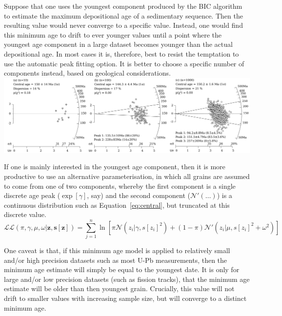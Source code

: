 \begin{refsection}
Suppose that one uses the youngest component produced by the BIC
algorithm to estimate the maximum depositional age of a sedimentary
sequence. Then the resulting value would never converge to a specific
value.  Instead, one would find this minimum age to drift to ever
younger values until a point where the youngest age component in a
large dataset becomes younger than the actual depositional age. In
most cases it is, therefore, best to resist the temptation to use the
automatic peak fitting option. It is better to choose a specific
number of components instead, based on geological considerations.\\

\noindent\includegraphics[width=\textwidth]{../figures/increasingn.png}
\begingroup {}
\label{fig:increasingn}
\endgroup

If one is mainly interested in the youngest age component, then it is
more productive to use an alternative parameterisation, in which all
grains are assumed to come from one of two components, whereby the
first component is a single discrete age peak ($\exp[\gamma]$, say)
and the second component ($\mathcal{N}'(\ldots)$) is a continuous
distribution such as Equation~\ref{eq:central}, but truncated at this
discrete value.
\begin{equation}
  \mathcal{LL}(\pi,\gamma,\mu,\omega|\mathbf{z},\mathbf{s[z]}) =
  \sum\limits_{j=1}^{n} \ln\!\left[
    \pi \mathcal{N}(z_i|\gamma,s[z_i]^2) +
    (1-\pi) \mathcal{N}'(z_i|\mu,s[z_i]^2+\omega^2)
    \right]
\label{eq:Lminagemod}
\end{equation}

One caveat is that, if this minimum age model is applied to relatively
small and/or high precision datasets such as most U-Pb measurements,
then the minimum age estimate will simply be equal to the youngest
date.  It is only for large and/or low precision datasets (such as
fission tracks), that the minimum age estimate will be older than then
youngest grain.  Crucially, this value will not drift to smaller
values with increasing sample size, but will converge to a distinct
minimum age.\\


\end{refsection}
